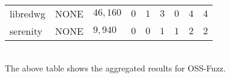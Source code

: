 \begin{adjustbox}{width=\textwidth,center}
\begin{tabular}{|l|l|l|l|l|l|l|l|l|}
libredwg         & NONE                & $46,160$            & $0$              & $1$           & $3$           & $0$            & $4$             & $4$                 \\
serenity         & NONE                & $9,940$             & $0$              & $0$           & $1$           & $1$            & $2$             & $2$                 \\
\hline
\end{tabular}
\end{adjustbox}{}
\ \\ \newline \newline
The above table shows the aggregated results for OSS-Fuzz.


\newpage
{}


